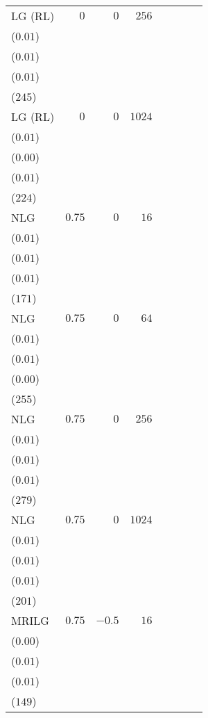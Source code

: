 \begin{table}[t]
\begin{tabular}{lrrrrrrr}
LG {\scriptsize(RL)} & \(0\) & \(0\) & \(256\) & \longcell{\(0.05\)\\{\tiny(\(0.01\))}} & \longcell{\(0.00\)\\{\tiny(\(0.01\))}} & \longcell{\(0.84\)\\{\tiny(\(0.01\))}} & \longcell{\(6079\)\\{\tiny(\(245\))}} \\[2.2ex]
LG {\scriptsize(RL)} & \(0\) & \(0\) & \(1024\) & \longcell{\(0.07\)\\{\tiny(\(0.01\))}} & \longcell{\(0.00\)\\{\tiny(\(0.00\))}} & \longcell{\(0.84\)\\{\tiny(\(0.01\))}} & \longcell{\(6027\)\\{\tiny(\(224\))}} \\[2.2ex]
NLG & \(0.75\) & \(0\) & \(16\) & \longcell{\(0.02\)\\{\tiny(\(0.01\))}} & \longcell{\(0.01\)\\{\tiny(\(0.01\))}} & \longcell{\(0.84\)\\{\tiny(\(0.01\))}} & \longcell{\(6248\)\\{\tiny(\(171\))}} \\[2.2ex]
NLG & \(0.75\) & \(0\) & \(64\) & \longcell{\(0.04\)\\{\tiny(\(0.01\))}} & \longcell{\(0.01\)\\{\tiny(\(0.01\))}} & \longcell{\(0.84\)\\{\tiny(\(0.00\))}} & \longcell{\(6134\)\\{\tiny(\(255\))}} \\[2.2ex]
NLG & \(0.75\) & \(0\) & \(256\) & \longcell{\(0.07\)\\{\tiny(\(0.01\))}} & \longcell{\(0.00\)\\{\tiny(\(0.01\))}} & \longcell{\(0.84\)\\{\tiny(\(0.01\))}} & \longcell{\(6167\)\\{\tiny(\(279\))}} \\[2.2ex]
NLG & \(0.75\) & \(0\) & \(1024\) & \longcell{\(0.10\)\\{\tiny(\(0.01\))}} & \longcell{\(0.01\)\\{\tiny(\(0.01\))}} & \longcell{\(0.84\)\\{\tiny(\(0.01\))}} & \longcell{\(6164\)\\{\tiny(\(201\))}} \\[2.2ex]
MRILG & \(0.75\) & \(-0.5\) & \(16\) & \longcell{\(0.02\)\\{\tiny(\(0.00\))}} & \longcell{\(0.00\)\\{\tiny(\(0.01\))}} & \longcell{\(0.84\)\\{\tiny(\(0.01\))}} & \longcell{\(6339\)\\{\tiny(\(149\))}} \\[2.2ex]

\end{tabular}
\end{table}
